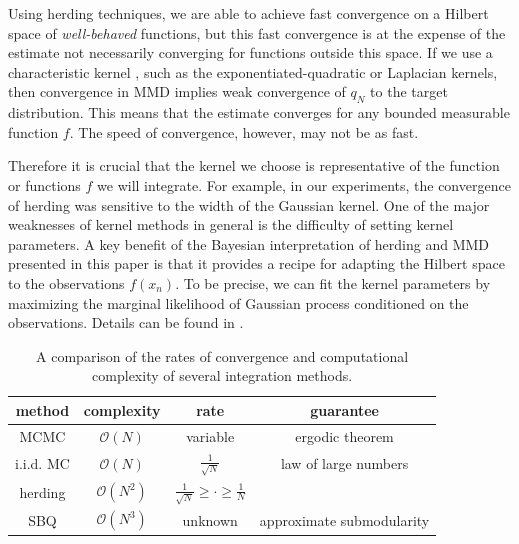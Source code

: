 Using herding techniques, we are able to achieve fast convergence on a Hilbert space of \emph{well-behaved} functions, but this fast convergence is at the expense of the estimate not necessarily converging for functions outside this space.
If we use a characteristic kernel \citep{Sriperumbudur2008}, such as the exponentiated-quadratic or Laplacian kernels, then convergence in MMD implies weak convergence of $q_N$ to the target distribution. 
This means that the estimate converges for any bounded measurable function $f$. The speed of convergence, however, may not be as fast.

Therefore it is crucial that the kernel we choose is representative of the function or functions $f$ we will integrate. For example, in our experiments, the convergence of herding was sensitive to the width of the Gaussian kernel. One of the major weaknesses of kernel methods in general is the difficulty of setting kernel parameters. A key benefit of the Bayesian interpretation of herding and MMD presented in this paper is that it provides a recipe for adapting the Hilbert space to the observations $f(x_n)$. To be precise, we can fit the kernel parameters by maximizing the marginal likelihood of Gaussian process conditioned on the observations. Details can be found in \citep{Rasmussen2006,Osborne2012}.

\begin{table}[t]
\begin{center}
	\begin{tabular}{c|ccc}
		method & complexity & rate & guarantee\\
		\midrule
		MCMC & $\mathcal{O}(N)$ & variable & ergodic theorem\\
		i.i.d. MC & $\mathcal{O}(N)$ & $\frac{1}{\sqrt{N}}$ & law of large numbers\\
		herding & $\mathcal{O}(N^2)$ & $\frac{1}{\sqrt{N}} \geq \cdot \geq \frac{1}{N}$ & \citep{Chen2010,Bach2012} \\
		SBQ & $\mathcal{O}(N^3)$ & unknown & approximate submodularity\\
	\end{tabular}
\end{center}
\caption{A comparison of the rates of convergence and computational complexity of several integration methods.}
\label{tbl:rates}
\end{table}

